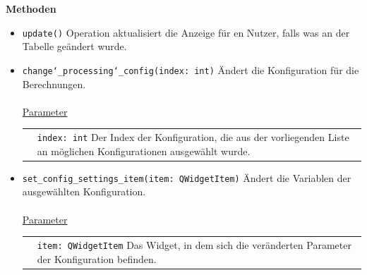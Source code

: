 \documentclass{article}
\begin{document}
\textbf{Methoden}
\begin{itemize}
\item \texttt{update()} \newline Operation aktualisiert die Anzeige für en Nutzer, falls was an der Tabelle geändert wurde.

\item \texttt{change\char`_processing\char`_config(index: int)} \newline Ändert die Konfiguration für die Berechnungen.
\\\\
\underline{Parameter} \\
\begin{tabular}{lp{10.7cm}}
&\texttt{index: int} Der Index der Konfiguration, die aus der vorliegenden Liste an möglichen Konfigurationen ausgewählt wurde.\\
\end{tabular}


\item \texttt{set\_config\_settings\_item(item: QWidgetItem)} \newline Ändert die Variablen der ausgewählten Konfiguration.
\\\\
\underline{Parameter} \\
\begin{tabular}{lp{10.7cm}}
&\texttt{item: QWidgetItem} Das Widget, in dem sich die veränderten Parameter der Konfiguration befinden.\\
\end{tabular}

\end{itemize}
\end{document}
